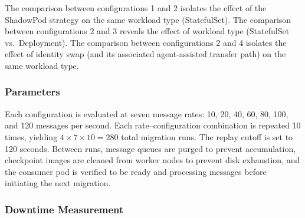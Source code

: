 \documentclass[conference]{IEEEtran}
\begin{document}
The comparison between configurations 1 and 2 isolates the effect of the
ShadowPod strategy on the same workload type (StatefulSet). The comparison
between configurations 2 and 3 reveals the effect of workload type (StatefulSet
vs.\ Deployment). The comparison between configurations 2 and 4 isolates the
effect of identity swap (and its associated agent-assisted transfer path) on the same workload type.

\subsubsection{Parameters}

Each configuration is evaluated at seven message rates: 10, 20, 40, 60, 80,
100, and 120 messages per second. Each rate--configuration combination is
repeated 10 times, yielding $4 \times 7 \times 10 = 280$ total migration runs.
The replay cutoff is set to 120 seconds. Between runs, message queues are purged
to prevent accumulation, checkpoint images are cleaned from worker nodes to
prevent disk exhaustion, and the consumer pod is verified to be ready and
processing messages before initiating the next migration.

\subsubsection{Downtime Measurement}
\label{sec:downtime-method}
\end{document}
